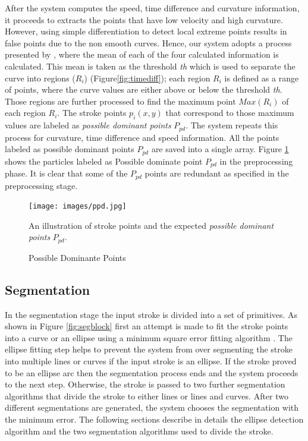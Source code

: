 \documentclass[preprint,1p,times,review]{elsarticle}
\begin{document}
After the system computes the speed, time difference and curvature information, it proceeds to extracts the points that have low velocity and high curvature. However, using simple differentiation to detect local extreme points results in false points due to the non smooth curves. Hence, our system adopts a process presented by \cite{earlyprocess}, where the mean of each of the four calculated information is calculated. This mean is taken as the threshold \textit{th} which is used to separate the curve into regions ($R_i$) (Figure\ref{fig:timediff}); each region $R_i$ is defined as a range of points, where the curve values are either above or below the threshold \textit{th}. Those regions are further processed to find the maximum point $Max(R_i)$ of each region $R_i$. The stroke points $p_i(x,y)$ that correspond to those maximum values are labeled as \textit{possible dominant points} $P_{pd}$. The system repeats this process for curvature, time difference and speed information. All the points labeled as possible dominant points $P_{pd}$ are saved into a single array. Figure \ref{fig:ppd999} shows the particles labeled as Possible dominate point $P_{pd}$ in the preprocessing phase. It is clear that some of the $P_{pd}$ points are redundant as specified in the preprocessing stage. %
\begin{figure}
	\centering
\texttt{[image: images/ppd.jpg]}
	\caption{Possible Dominante Points} An illustration of stroke points and
the expected \textit{possible dominant points} $P_{pd}$.
	\label{fig:ppd999}
\end{figure}

\subsection{Segmentation}
\label{seg}
In the segmentation stage the input stroke is divided into a set of primitives. As shown in Figure \ref{fig:segblock} first an attempt is made to fit the stroke points into a curve or an ellipse using a minimum square error fitting algorithm \cite{ellipsefit}. The ellipse fitting step helps to prevent the system from over segmenting the stroke into multiple lines or curves if the input stroke is an ellipse. If the stroke proved to be an ellipse arc then the segmentation process ends and the system proceeds to the next step. Otherwise, the stroke is passed to two further segmentation algorithms that divide the stroke to either lines or lines and curves. After two different segmentations are generated, the system chooses the segmentation with the minimum error. The following sections describe in details the ellipse detection algorithm and the two segmentation algorithms used to divide the stroke.
\end{document}
